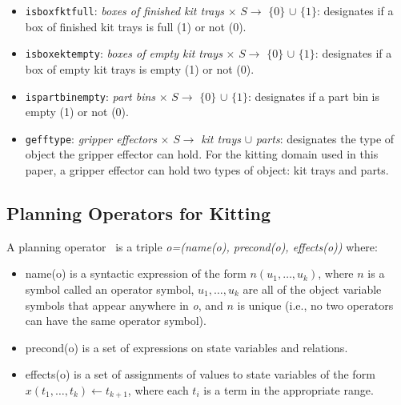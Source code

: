 \begin{itemize}
\item \texttt{isboxfktfull}: \textit{boxes of finished kit trays} $\times$ $S \rightarrow$ $\lbrace 0\rbrace$ $\cup$ $\lbrace 1\rbrace$: designates if a box of finished kit trays is full (1) or not (0).

\item \texttt{isboxektempty}: \textit{boxes of empty kit trays} $\times$ $S \rightarrow$ $\lbrace 0\rbrace$ $\cup$ $\lbrace 1\rbrace$: designates if a box of empty kit trays is empty (1) or not (0).

\item \texttt{ispartbinempty}: \textit{part bins} $\times$ $S \rightarrow$ $\lbrace 0\rbrace$ $\cup$ $\lbrace 1\rbrace$: designates if a part bin is empty (1) or not (0).

\item \texttt{gefftype}: \textit{gripper effectors} $\times$ $S \rightarrow$ \textit{kit trays} $\cup$ \textit{parts}: designates the type of object the gripper effector can hold. For the kitting domain used in this paper, a gripper effector can hold two types of object: kit trays and parts.
\end{itemize}


\subsection{Planning Operators for Kitting}
A planning operator~\cite{NAU.2004} is a triple \textit{o=(name(o), precond(o), effects(o))}
where:
\begin{itemize}
\item name(o) is a syntactic expression of the form $n(u_1,\dots,u_k)$, where $n$ is a symbol
called an operator symbol, $u_1,\dots,u_k$ are all of the object variable symbols that
appear anywhere in \textit{o}, and $n$ is unique (i.e., no two operators can have the
same operator symbol).
\item precond(o) is a set of expressions on state variables and relations.
\item effects(o) is a set of assignments of values to state variables of the form
$x(t_1,\dots,t_k)\leftarrow t_{k+1}$, where each $t_i$ is a term in the appropriate range.
\end{itemize}

